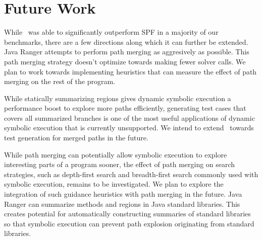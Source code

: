 \section{Future Work}
\label{sec:futureWork}
While \tool\ was able to significantly outperform SPF in a majority of our benchmarks, there are a few directions
along which it can further be extended.
%
Java Ranger attempts to perform path merging as aggresively as possible.
%
This path merging strategy doesn't optimize towards making fewer solver calls.
%
We plan to work towards implementing heuristics that can measure the effect of path merging on the rest of the program.
    
While statically summarizing regions gives dynamic symbolic execution a performance boost to explore more paths
efficiently, generating test cases that covers all summarized branches is one of the most useful applications of dynamic
symbolic execution that is currently unsupported.
%
We intend to extend \tool\ towards test generation for merged paths in the future.

While path merging can potentially allow symbolic execution to explore interesting parts of a program sooner, the
effect of path merging on search strategies, such as depth-first search and breadth-first search commonly used with
symbolic execution, remains to be investigated.
%
We plan to explore the integration of such guidance heuristics with path merging in the future.
%
Java Ranger can summarize methods and regions in Java standard libraries.
%
This creates potential for automatically constructing summaries of standard libraries so that symbolic execution
can prevent path explosion originating from standard libraries.
%
